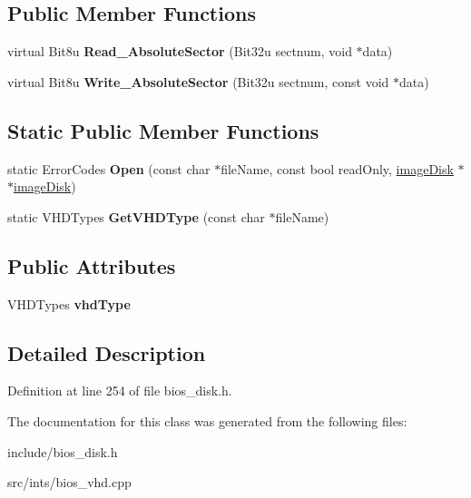 \subsection*{Public Member Functions}
\begin{DoxyCompactItemize}
\item 
\hypertarget{classimageDiskVHD_a928117145e7f5abd8ff0f151d3d27186}{virtual Bit8u {\bfseries Read\-\_\-\-Absolute\-Sector} (Bit32u sectnum, void $\ast$data)}\label{classimageDiskVHD_a928117145e7f5abd8ff0f151d3d27186}

\item 
\hypertarget{classimageDiskVHD_a86534727d81baae796b45b6a795b73df}{virtual Bit8u {\bfseries Write\-\_\-\-Absolute\-Sector} (Bit32u sectnum, const void $\ast$data)}\label{classimageDiskVHD_a86534727d81baae796b45b6a795b73df}

\end{DoxyCompactItemize}
\subsection*{Static Public Member Functions}
\begin{DoxyCompactItemize}
\item 
\hypertarget{classimageDiskVHD_a8c85843d48694462046b6b9a02c8f4f9}{static Error\-Codes {\bfseries Open} (const char $\ast$file\-Name, const bool read\-Only, \hyperlink{classimageDisk}{image\-Disk} $\ast$$\ast$\hyperlink{classimageDisk}{image\-Disk})}\label{classimageDiskVHD_a8c85843d48694462046b6b9a02c8f4f9}

\item 
\hypertarget{classimageDiskVHD_ac493a1534615d6aa2c3a0cda6dbc9a31}{static V\-H\-D\-Types {\bfseries Get\-V\-H\-D\-Type} (const char $\ast$file\-Name)}\label{classimageDiskVHD_ac493a1534615d6aa2c3a0cda6dbc9a31}

\end{DoxyCompactItemize}
\subsection*{Public Attributes}
\begin{DoxyCompactItemize}
\item 
\hypertarget{classimageDiskVHD_a39c97d47ff1d52756d8cf86fc53e352d}{V\-H\-D\-Types {\bfseries vhd\-Type}}\label{classimageDiskVHD_a39c97d47ff1d52756d8cf86fc53e352d}

\end{DoxyCompactItemize}


\subsection{Detailed Description}


Definition at line 254 of file bios\-\_\-disk.\-h.



The documentation for this class was generated from the following files\-:\begin{DoxyCompactItemize}
\item 
include/bios\-\_\-disk.\-h\item 
src/ints/bios\-\_\-vhd.\-cpp\end{DoxyCompactItemize}
